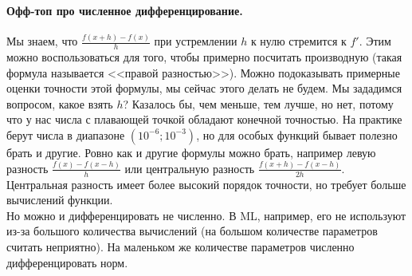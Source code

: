\documentclass{article}
\begin{document}
    \paragraph{Офф-топ про численное дифференцирование.}
    Мы знаем, что $\frac{f(x+h)-f(x)}h$ при устремлении $h$ к нулю стремится к $f'$. Этим можно воспользоваться для того, чтобы примерно посчитать производную (такая формула называется <<правой разностью>>). Можно подоказывать примерные оценки точности этой формулы, мы сейчас этого делать не будем. Мы зададимся вопросом, какое взять $h$? Казалось бы, чем меньше, тем лучше, но нет, потому что у нас числа с плавающей точкой обладают конечной точностью. На практике берут числа в диапазоне $(10^{-6};10^{-3})$, но для особых функций бывает полезно брать и другие. Ровно как и другие формулы можно брать, например левую разность $\frac{f(x)-f(x-h)}h$ или центральную разность $\frac{f(x+h)-f(x-h)}{2h}$. Центральная разность имеет более высокий порядок точности, но требует больше вычислений функции.\\
    Но можно и дифференцировать не численно. В ML, например, его не используют из-за большого количества вычислений (на большом количестве параметров считать неприятно). На маленьком же количестве параметров численно дифференцировать норм.
\end{document}
